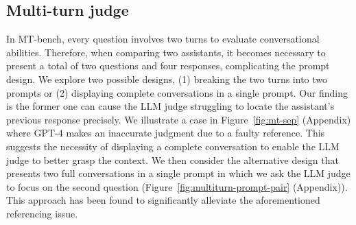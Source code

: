 \subsection{Multi-turn judge}
In MT-bench, every question involves two turns to evaluate conversational abilities. 
Therefore, when comparing two assistants, it becomes necessary to present a total of two questions and four responses, complicating the prompt design.
We explore two possible designs, (1) breaking the two turns into two prompts or (2) displaying complete conversations in a single prompt.
Our finding is the former one can cause the LLM judge struggling to locate the assistant's previous response precisely.
We illustrate a case in Figure~\ref{fig:mt-sep} (Appendix) where GPT-4 makes an inaccurate judgment due to a faulty reference.
This suggests the necessity of displaying a complete conversation to enable the LLM judge to better grasp the context. 
We then consider the alternative design that presents two full conversations in a single prompt in which we ask the LLM judge to focus on the second question (Figure~\ref{fig:multiturn-prompt-pair} (Appendix)).
This approach has been found to significantly alleviate the aforementioned referencing issue. %











